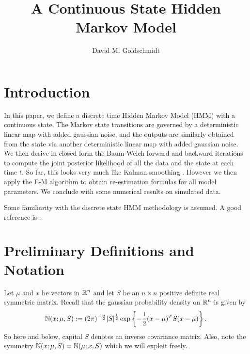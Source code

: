 \documentclass[12pt,leqno]{article}
\title{A Continuous State Hidden Markov Model}
\author{David M. Goldschmidt}
\begin{document}
\newcommand{\p}{\ensuremath{u}}
\newcommand{\VV}{V}
\maketitle


\section{Introduction}
In this paper, we define a discrete time Hidden Markov Model (HMM) with a continuous state.  The Markov state transitions
are governed by a deterministic linear map with added gaussian noise, and the outputs are similarly obtained from the
state via another deterministic linear map with added gaussian noise.  We then derive in closed form the Baum-Welch forward
and backward iterations \cite{Rabiner} to compute the joint posterior likelihood of all the data and the state at each
time $t$.  So far, this looks very much like Kalman smoothing \cite{}.  However we then apply the E-M algorithm \cite{}
to obtain re-estimation formulas for all model parameters.   We conclude with some numerical results on simulated data.

Some familiarity with the discrete state HMM methodology is assumed.  A good reference is \cite{bilmes}. 

\section{Preliminary Definitions and Notation}
Let $\mu$ and $x$ be vectors in ${\mathbb R}^n$ and let $S$ be an $n\times{n}$ positive
definite real symmetric matrix.  Recall that the gaussian probability density
on ${\mathbb R}^n$ is given by 
$$
{\mathbb N}(x;\mu,S) := (2\pi)^{-\frac{n}{2}}|S|^{\frac{1}{2}}\exp\left\{-\frac{1}{2}
(x - \mu)^TS(x-\mu)\right\}.
$$
So here and below, capital $S$ denotes an inverse covariance matrix. Also, note the symmetry ${\mathbb N}(x;\mu,S) = {\mathbb N}(\mu;x,S)$
which we will exploit freely.
\end{document}
